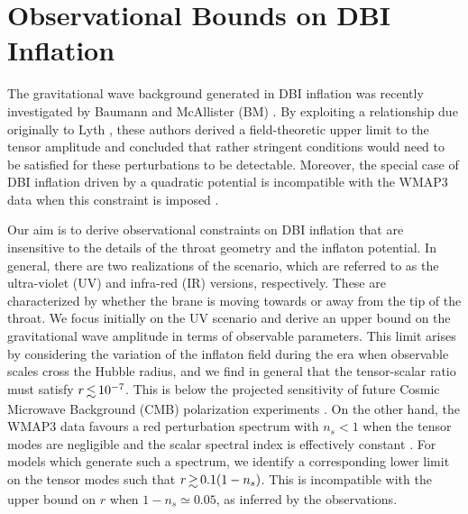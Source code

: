 \renewcommand{\CVSrevision}{\version$Id: dbi.tex,v 1.16 2009/07/29 20:12:28 ith Exp $}
% 

\chapter{Observational Bounds on DBI Inflation}
\label{ch:dbi}
% 
% 
% 

The gravitational wave background generated in DBI 
inflation was recently investigated by Baumann and McAllister (BM) 
\cite{bmpaper}. By exploiting a relationship due originally 
to Lyth \cite{lyth}, these authors derived a field-theoretic upper limit 
to the tensor amplitude and concluded that 
rather stringent conditions would need to be satisfied for these 
perturbations to be detectable.      
Moreover, the special case of 
DBI inflation driven by a quadratic potential is incompatible with the WMAP3 
data when this constraint is imposed \cite{bean}.  


Our aim is to derive observational constraints on DBI inflation that are 
insensitive to the details of the throat geometry and the inflaton potential. 
In general, there are two realizations of the scenario, 
which are referred to as the ultra-violet (UV) and infra-red (IR) 
versions, respectively. These are characterized by whether the brane is 
moving towards or away from the tip of the throat. 
We focus initially on the UV scenario 
and derive an upper bound on 
the gravitational wave amplitude in terms of observable 
parameters. This limit arises by considering 
the variation of the inflaton field during the era when 
observable scales cross the Hubble radius, and 
we find in general that the tensor-scalar ratio must satisfy 
$r \, \lsim \, 10^{-7}$. This 
is below the projected sensitivity of future Cosmic Microwave Background (CMB) polarization 
experiments \cite{clover,vpj}. 
On the other hand, the WMAP3 data 
favours a red perturbation spectrum with 
$n_s<1$ when the tensor modes are negligible and 
the scalar spectral index is effectively constant \cite{spergel}. 
For models which generate such a spectrum, 
we identify a corresponding lower limit on the 
tensor modes such that $r \, \gsim \, 0.1 (1-n_s)$. 
This is incompatible with the upper bound 
on $r$ when $1-n_s \simeq 0.05$, as inferred
by the observations. 

